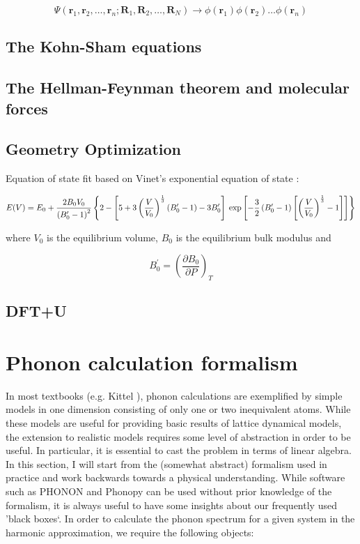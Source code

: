 \[ \Psi(\bm{r}_1,\bm{r}_2,\dots, \bm{r}_n; \bm{R}_1, \bm{R}_2, \dots , \bm{R}_N) \longrightarrow \phi(\bm{r}_1)\phi(\bm{r}_2)\dots\phi(\bm{r}_n) \]

\subsection{The Kohn-Sham equations}

\subsection{The Hellman-Feynman theorem and molecular forces}

\subsection{Geometry Optimization}
Equation of state fit based on Vinet's exponential equation of state \cite{Vinet1987}:

\begin{equation*}
\tiny
E(V) = E_0 + \frac{2B_0V_0}{\left(B_0^\prime-1\right)^2}\left\lbrace 2 -\left[ 5 + 3\left( \frac{V}{V_0}\right)^\frac{1}{3} (B_0^\prime -1)  -3B_0^\prime \right] \right. \left. \exp \left[ -\frac{3}{2} \left( B_0^\prime-1\right)\left[\left( \frac{V}{V_0}\right)^\frac{1}{3} -1\right]\right]\right\rbrace
\end{equation*}

\noindent where $V_0$ is the equilibrium volume, $B_0$ is the equilibrium bulk modulus and 

\begin{equation*}
B_0^\prime = \left( \frac{\partial B_0}{\partial P}\right)_T
\end{equation*}

\subsection{DFT+U}

\section{Phonon calculation formalism}
In most textbooks (e.g. Kittel \cite{Kittel2005}), phonon calculations are exemplified by simple models in one dimension consisting of only one or two inequivalent atoms. While these models are useful for providing basic results of lattice dynamical models, the extension to realistic models requires some level of abstraction in order to be useful. In particular, it is essential to cast the problem in terms of linear algebra. In this section, I will start from the (somewhat abstract) formalism used in practice and work backwards towards a physical understanding. While software such as PHONON \cite{Parlinski1997} and Phonopy \cite{Togo2015} can be used without prior knowledge of the formalism, it is always useful to have some insights about our frequently used 'black boxes`. In order to calculate the phonon spectrum for a given system in the harmonic approximation, we require the following objects:

